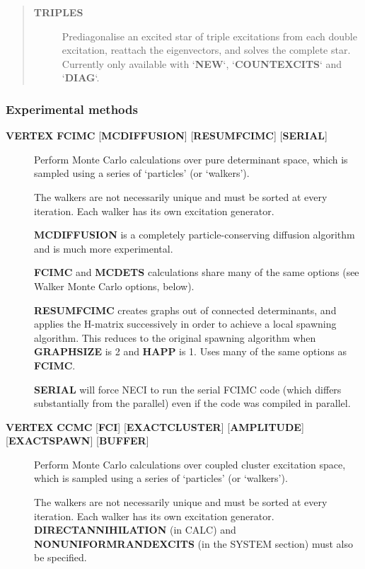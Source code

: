 \documentclass[openany,a4paper,10pt,english]{manual}
\begin{document}
\begin{description}
\begin{quote}
\begin{description}
\item[\textbf{TRIPLES}] \leavevmode
Prediagonalise an excited star of triple excitations from each
double excitation, reattach the eigenvectors, and solves
the complete star. Currently only available with `\textbf{NEW}`,
`\textbf{COUNTEXCITS}` and `\textbf{DIAG}`.

\end{description}
\end{quote}

\end{description}


\subsubsection{Experimental methods}
\begin{description}
\item[\textbf{VERTEX} \textbf{FCIMC} {[}\textbf{MCDIFFUSION}{]} {[}\textbf{RESUMFCIMC}{]} {[}\textbf{SERIAL}{]}] \leavevmode
Perform Monte Carlo calculations over pure determinant space, which
is sampled using a series of `particles' (or `walkers').

The walkers are not necessarily unique and must be sorted at every
iteration.  Each walker has its own excitation generator.

\textbf{MCDIFFUSION} is a completely particle-conserving diffusion
algorithm and is much more experimental.

\textbf{FCIMC} and \textbf{MCDETS} calculations share many of the same options
(see Walker Monte Carlo options, below).

\textbf{RESUMFCIMC} creates graphs out of connected determinants, and applies
the H-matrix successively in order to achieve a local spawning algorithm.
This reduces to the original spawning algorithm when \textbf{GRAPHSIZE} is 2 and
\textbf{HAPP} is 1. Uses many of the same options as \textbf{FCIMC}.

\textbf{SERIAL} will force NECI to run the serial FCIMC code (which differs
substantially from the parallel) even if the code was compiled in parallel.

\item[\textbf{VERTEX} \textbf{CCMC} {[}\textbf{FCI}{]} {[}\textbf{EXACTCLUSTER}{]} {[}\textbf{AMPLITUDE}{]} {[}\textbf{EXACTSPAWN}{]} {[}\textbf{BUFFER}{]}] \leavevmode
Perform Monte Carlo calculations over coupled cluster excitation space, which
is sampled using a series of `particles' (or `walkers').

The walkers are not necessarily unique and must be sorted at every
iteration.  Each walker has its own excitation generator.
\textbf{DIRECTANNIHILATION} (in CALC) and \textbf{NONUNIFORMRANDEXCITS} (in the SYSTEM section)
must also be specified.


\end{description}
\end{document}

